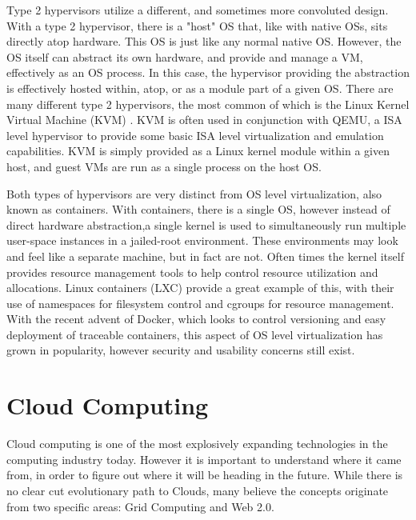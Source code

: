 Type 2 hypervisors utilize a different, and sometimes more convoluted design. With a type 2 hypervisor, there is a "host" OS that, like with native OSs, sits directly atop hardware. This OS is just like any normal native OS. However, the OS itself can abstract its own hardware, and provide and manage a VM, effectively as an OS process.  In this case, the hypervisor providing the abstraction is effectively hosted within, atop, or as a module part of a given OS.  There are many different type 2 hypervisors, the most common of which is the Linux Kernel Virtual Machine (KVM) \cite{kivity2007kvm}. KVM is often used in conjunction with QEMU, a ISA level hypervisor to provide some basic ISA level virtualization and emulation capabilities. KVM is simply provided as a Linux kernel module within a given host, and guest VMs are run as a single process on the host OS. 
 
Both types of hypervisors are very distinct from OS level virtualization, also known as containers. With containers, there is a single OS, however instead of direct hardware abstraction,a single kernel is used to simultaneously run multiple user-space instances in a jailed-root environment. These environments may look and feel like a separate machine, but in fact are not. Often times the kernel itself provides resource management tools to help control resource utilization and allocations. Linux containers (LXC) \cite{lxc} provide a great example of this, with their use of namespaces for filesystem control and cgroups for resource management. With the recent advent of Docker, which looks to control versioning and easy deployment of traceable containers, this aspect of OS level virtualization has grown in popularity, however security and usability concerns still exist.   


\section{Cloud Computing}
\label{sec:cloudcomputing}

Cloud computing is one of the most explosively expanding technologies in the computing industry today. However it is important to understand where it came from, in order to figure out where it will be heading in the future.  While there is no clear cut evolutionary path to Clouds, many believe the concepts originate from two specific areas: Grid Computing and Web 2.0.

